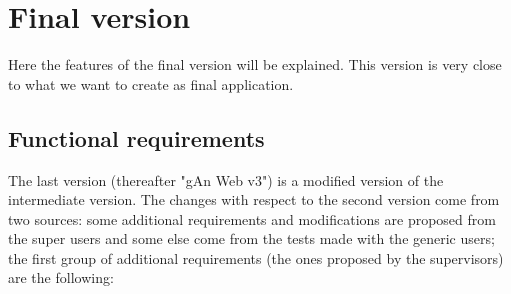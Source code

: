
\chapter{Final version} %

\label{Chapter6} %

Here the features of the final version will be explained. This version is very close to what we want to create as final application.

\section{Functional requirements}

The last version (thereafter "gAn Web v3") is a modified version of the intermediate version. 
The changes with respect to the second version come from two sources: some additional requirements and modifications are proposed from the super users and some else come from the tests made with the generic users; 
the first group of additional requirements (the ones proposed by the supervisors) are the following:


